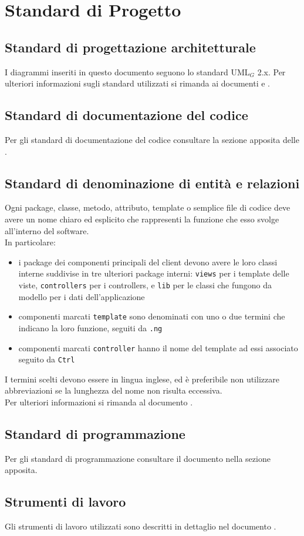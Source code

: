 \section{Standard di Progetto}
\subsection{Standard di progettazione architetturale}
I diagrammi inseriti in questo documento seguono lo standard UML$_G$ 2.x. Per ulteriori informazioni sugli standard utilizzati si rimanda ai documenti \ST{} e \NdP{}.
\subsection{Standard di documentazione del codice}
Per gli standard di documentazione del codice consultare la sezione apposita delle \NdP{}.
\subsection{Standard di denominazione di entità e relazioni}
Ogni package, classe, metodo, attributo, template o semplice file di codice deve avere un nome chiaro ed esplicito che rappresenti la funzione che esso svolge all'interno del software. \\
In particolare:
\begin{itemize}
	\item i package dei componenti principali del client devono avere le loro classi interne suddivise in tre ulteriori package interni: \texttt{views} per i template delle viste, \texttt{controllers} per i controllers, e \texttt{lib} per le classi che fungono da modello per i dati dell'applicazione
	\item componenti marcati \texttt{template} sono denominati con uno o due termini che indicano la loro funzione, seguiti da \texttt{.ng}
	\item componenti marcati \texttt{controller} hanno il nome del template ad essi associato seguito da \texttt{Ctrl}
\end{itemize}
I termini scelti devono essere in lingua inglese, ed è preferibile non utilizzare abbreviazioni se la lunghezza del nome non risulta eccessiva. \\
Per ulteriori informazioni si rimanda al documento \NdP{}.
\subsection{Standard di programmazione}
Per gli standard di programmazione consultare il documento \NdP{} nella sezione apposita. 
\subsection{Strumenti di lavoro}
Gli strumenti di lavoro utilizzati sono descritti in dettaglio nel documento \NdP{}.